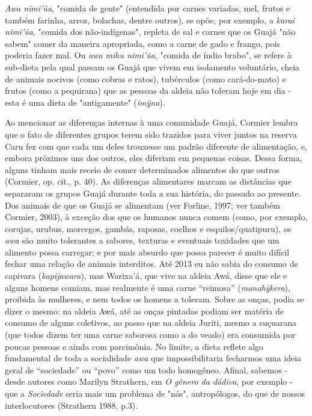 \emph{Awa nimi'ũa}, "comida de gente" (entendida por carnes variadas,
mel, frutos e também farinha, arroz, bolachas, dentre outros), se opõe,
por exemplo, a \emph{karai nimi'ũa}, "comida dos não-indígenas", repleta
de sal e carnes que os Guajá "não sabem" comer da maneira apropriada,
como a carne de gado e frango, pois poderia fazer mal. Ou \emph{awa mihu
nimi'ũa}, "comida de índio brabo", se refere à sub-dieta pela qual
passam os Guajá que vivem em isolamento voluntário, cheia de animais
nocivos (como cobras e ratos), tubérculos (como cará-do-mato) e frutos
(como a pequirana) que as pessoas da aldeia não toleram hoje em dia -
esta é uma dieta de "antigamente" (\emph{imỹna}).

Ao mencionar as diferenças internas à uma comunidade Guajá, Cormier
lembra que o fato de diferentes grupos terem sido trazidos para viver
juntos na reserva Caru fez com que cada um deles trouxesse um padrão
diferente de alimentação, e, embora próximos uns dos outros, eles
diferiam em pequenas coisas. Dessa forma, alguns tinham mais receio de
comer determinados alimentos do que outros (Cormier, op. cit., p. 40).
As diferenças alimentares marcam as distâncias que separaram os grupos
Guajá durante toda a sua história, do passado ao presente. Dos animais
de que os Guajá se alimentam (ver Forline, 1997; ver também Cormier,
2003), à exceção dos que os humanos nunca comem (como, por exemplo,
corujas, urubus, morcegos, gambás, raposas, coelhos e
esquilos/quatipuru), os \emph{awa} são muito tolerantes a sabores,
texturas e eventuais toxidades que um alimento possa carregar; e por
mais absurdo que possa parecer é muito difícil fechar uma relação de
animais interditos. Até 2013 eu não sabia do consumo de capivara
(\emph{kapijawara}), mas Warixa'á, que vive na aldeia Awá, disse que ele
e alguns homens comiam, mas realmente é uma carne ``reimosa''
(\emph{manahỹkera}), proibida às mulheres, e nem todos os homens a
toleram. Sobre as onças, podia se dizer o mesmo: na aldeia Awá, até as
onças pintadas podiam ser matéria de consumo de alguns coletivos, ao
passo que na aldeia Juriti, mesmo a suçuarana (que todos dizem ter uma
carne saborosa como a do veado) era consumida por poucas pessoas e ainda
com parcimônia. No limite, a dieta reflete algo fundamental de toda a
socialidade \emph{awa} que impossibilitaria fecharmos uma ideia geral de
``sociedade'' ou ``povo'' como um todo homogêneo. Afinal, sabemos -
desde autores como Marilyn Strathern, em \emph{O gênero da dádiva}, por
exemplo - que a \emph{Sociedade} seria mais um problema de "nós",
antropólogos, do que de nossos interlocutores (Strathern 1988, p.3).

